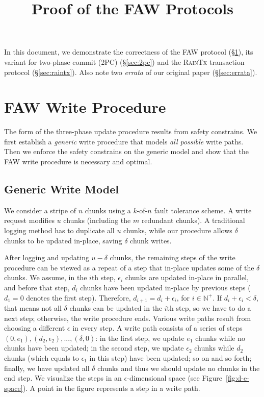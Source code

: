 \documentclass[letterpaper,10pt,twocolumn]{article}
\date{}
\def\protocol/{FAW}
\begin{document}
\title{Proof of the \protocol/ Protocols}

\maketitle

In this document, we demonstrate the correctness of the \protocol/ protocol (\S\ref{sec:faw}), its variant for two-phase commit (2PC) (\S\ref{sec:2pc}) and the \textsc{RainTx} transaction protocol (\S\ref{sec:raintx}).
Also note two \emph{errata} of our original paper (\S\ref{sec:errata}).

\section{\protocol/ Write Procedure}
\label{sec:faw}

The form of the three-phase update procedure results from safety constrains.
We first establish a \emph{generic} write procedure that models \emph{all possible} write paths.
Then we enforce the safety constrains on the generic model and show that the \protocol/ write procedure is necessary and optimal. 

\subsection{Generic Write Model}

We consider a stripe of $n$ chunks using a $k$-of-$n$ fault tolerance scheme.
A write request modifies $u$ chunks (including the $m$ redundant chunks).
A traditional logging method has to duplicate all $u$ chunks, while our procedure allows $\delta$ chunks to be updated in-place, saving $\delta$ chunk writes.

After logging and updating $u - \delta$ chunks, the remaining steps of the write procedure can be viewed as a repeat of a step that in-place updates some of the $\delta$ chunks.
We assume, in the $i$th step, $\epsilon_i$ chunks are updated in-place in parallel, and before that step, $d_i$ chunks have been updated in-place by previous steps ($d_1=0$ denotes the first step).
Therefore, $d_{i+1} = d_i + \epsilon_i$, for $i \in \mathbb{N}^{+}$. If $d_i + \epsilon_i < \delta$, that means not all $\delta$ chunks can be updated in the $i$th step, so we have to do a next step; otherwise, the write procedure ends.
Various write paths result from choosing a different $\epsilon$ in every step.
A write path consists of a series of steps $(0, e_1), (d_2, \epsilon_2), ..., (\delta, 0)$: in the first step, we update $e_1$ chunks while no chunks have been updated; in the second step, we update $\epsilon_2$ chunks while $d_2$ chunks (which equals to $\epsilon_1$ in this step) have been updated; so on and so forth; finally, we have updated all $\delta$ chunks and thus we should update no chunks in the end step.
We visualize the steps in an $\epsilon$-dimensional space (see Figure~\ref{fig:d-e-space}).
A point in the figure represents a step in a write path.
\end{document}
